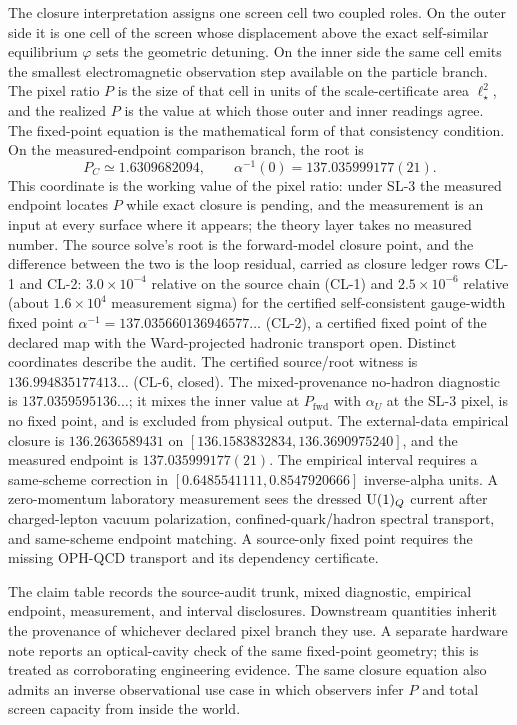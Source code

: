 The closure interpretation assigns one screen cell two coupled roles. On the outer side it is one
cell of the screen whose displacement above the exact self-similar equilibrium \(\varphi\) sets
the geometric detuning. On the inner side the same cell emits the smallest electromagnetic
observation step available on the particle branch. The pixel ratio \(P\) is the size of that cell
in units of the scale-certificate area \(\ell_\star^2\), and the realized \(P\) is the value at which those
outer and inner readings agree. The fixed-point equation is the mathematical form of that
consistency condition. On the measured-endpoint comparison branch, the root is
\[
P_C\simeq1.6309682094,\qquad
\alpha^{-1}(0)=137.035999177(21).
\]
This coordinate is the working value of the pixel ratio: under SL-3 the measured endpoint
locates \(P\) while exact closure is pending, and the measurement is an input at every surface
where it appears; the theory layer takes no measured number. The source solve's root is the
forward-model closure point, and the difference between the two is the loop residual, carried as
closure ledger rows CL-1 and CL-2: \(3.0\times10^{-4}\) relative on the source
chain (CL-1) and \(2.5\times10^{-6}\) relative (about \(1.6\times10^{4}\) measurement sigma)
for the certified self-consistent gauge-width fixed point
\(\alpha^{-1}=137.035660136946577\ldots\) (CL-2), a certified fixed point of the declared map
with the Ward-projected hadronic transport open. Distinct coordinates describe the
audit. The certified source/root witness is \(136.994835177413\ldots\) (CL-6, closed).
The mixed-provenance no-hadron
diagnostic is \(137.0359595136\ldots\); it mixes the inner value at \(P_{\mathrm{fwd}}\) with
\(\alpha_U\) at the SL-3 pixel, is no fixed point, and is excluded from physical output. The
external-data empirical closure is
\(136.2636589431\) on \([136.1583832834,136.3690975240]\), and the measured endpoint is
\(137.035999177(21)\). The empirical interval requires a same-scheme correction in
\([0.6485541111,0.8547920666]\) inverse-alpha units. A zero-momentum laboratory measurement sees
the dressed \(\mathrm{U}(1)_Q\) current after charged-lepton vacuum polarization, confined-quark/hadron
spectral transport, and same-scheme endpoint matching. A source-only fixed point requires the
missing OPH-QCD transport and its dependency certificate.

The claim table records the source-audit trunk, mixed diagnostic, empirical endpoint, measurement,
and interval disclosures. Downstream quantities inherit the provenance of whichever declared
pixel branch they use.
A separate hardware note reports an optical-cavity check of the same fixed-point geometry;
this is treated as corroborating engineering evidence.
The same closure equation also admits an inverse observational use case in which observers infer
\(P\) and total screen capacity from inside the world.

